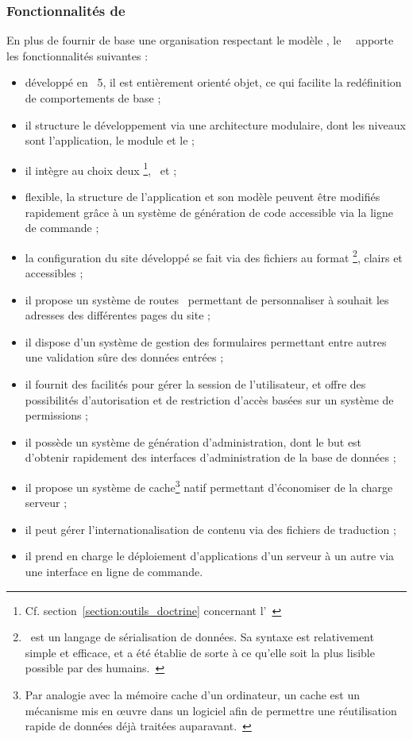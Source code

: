 \subsubsection{Fonctionnalités de \asf}

En plus de fournir de base une organisation respectant le modèle \amvc, le \afm\ \asf\ apporte les fonctionnalités suivantes :

\begin{itemize}
	\item développé en \aphp~5, il est entièrement orienté objet, ce qui facilite la redéfinition de comportements de base ;
	\item il structure le développement via une architecture modulaire, dont les niveaux sont l'application, le module et le \aplugin ;
	\item il intègre au choix deux \aorms\footnote{Cf. section~\ref{section:outils_doctrine} concernant l'\aorm\ \adoctrine}, \adoctrine\ et \apropel ;
	\item flexible, la structure de l'application et son modèle peuvent être modifiés rapidement grâce à un système de génération de code accessible via la ligne de commande ;
	\item la configuration du site développé se fait via des fichiers au format \ayml\footnote{\ayml\ est un langage de sérialisation de données. Sa syntaxe est relativement simple et efficace, et a été établie de sorte à ce qu'elle soit la plus lisible possible par des humains.~\cite{yml}}, clairs et accessibles ;
	\item il propose un système de \og routes \fg\ permettant de personnaliser à souhait les adresses des différentes pages du site ;
	\item il dispose d'un système de gestion des formulaires permettant entre autres une validation sûre des données entrées ;
	\item il fournit des facilités pour gérer la session de l'utilisateur, et offre des possibilités d'autorisation et de restriction d'accès basées sur un système de permissions ;
	\item il possède un système de génération d'administration, dont le but est d'obtenir rapidement des interfaces d'administration de la base de don\-nées ;
	\item il propose un système de cache\footnote{Par analogie avec la mémoire cache d'un ordinateur, un cache est un mécanisme mis en œuvre dans un logiciel afin de permettre une réutilisation rapide de données déjà traitées auparavant.~\cite{cache}} natif permettant d'économiser de la charge serveur ;
	\item il peut gérer l'internationalisation de contenu via des fichiers de traduction ;
	\item il prend en charge le déploiement d'applications d'un serveur à un autre via une interface en ligne de commande.
\end{itemize}
